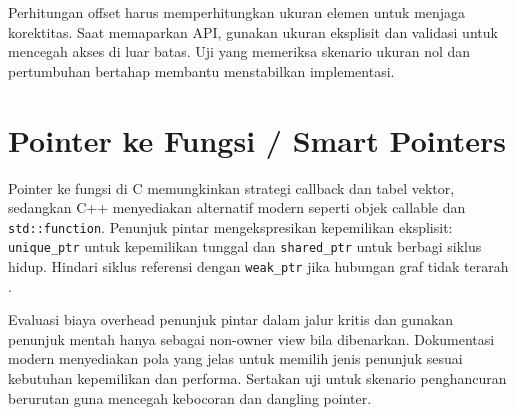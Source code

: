 \documentclass[../main.tex]{subfiles}
\begin{document}
Perhitungan offset harus memperhitungkan ukuran elemen untuk menjaga korektitas. Saat memaparkan API, gunakan ukuran eksplisit dan validasi untuk mencegah akses di luar batas. Uji yang memeriksa skenario ukuran nol dan pertumbuhan bertahap membantu menstabilkan implementasi.

\section{Pointer ke Fungsi / Smart Pointers}
Pointer ke fungsi di C memungkinkan strategi callback dan tabel vektor, sedangkan C++ menyediakan alternatif modern seperti objek callable dan \texttt{std::function}. Penunjuk pintar mengekspresikan kepemilikan eksplisit: \texttt{unique\_ptr} untuk kepemilikan tunggal dan \texttt{shared\_ptr} untuk berbagi siklus hidup. Hindari siklus referensi dengan \texttt{weak\_ptr} jika hubungan graf tidak terarah \parencite{cpp-reference}.

Evaluasi biaya overhead penunjuk pintar dalam jalur kritis dan gunakan penunjuk mentah hanya sebagai non-owner view bila dibenarkan. Dokumentasi modern menyediakan pola yang jelas untuk memilih jenis penunjuk sesuai kebutuhan kepemilikan dan performa. Sertakan uji untuk skenario penghancuran berurutan guna mencegah kebocoran dan dangling pointer.
\end{document}
